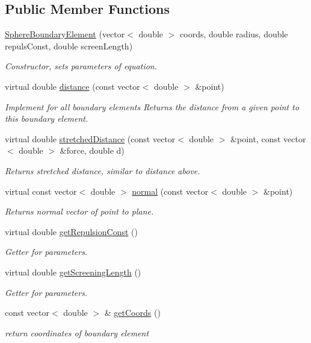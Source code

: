 \subsection*{Public Member Functions}
\begin{DoxyCompactItemize}
\item 
\hyperlink{classSphereBoundaryElement_a03cc51e8db0d5f638d772ac95720f436}{Sphere\+Boundary\+Element} (vector$<$ double $>$ coords, double radius, double repuls\+Const, double screen\+Length)
\begin{DoxyCompactList}\small\item\em Constructor, sets parameters of equation. \end{DoxyCompactList}\item 
virtual double \hyperlink{classSphereBoundaryElement_a8e28d60646f36a7ff943e69e62f248e4}{distance} (const vector$<$ double $>$ \&point)
\begin{DoxyCompactList}\small\item\em Implement for all boundary elements Returns the distance from a given point to this boundary element. \end{DoxyCompactList}\item 
virtual double \hyperlink{classSphereBoundaryElement_a41d124459d11422c46c578f70d1af1b0}{stretched\+Distance} (const vector$<$ double $>$ \&point, const vector$<$ double $>$ \&force, double d)
\begin{DoxyCompactList}\small\item\em Returns stretched distance, similar to distance above. \end{DoxyCompactList}\item 
virtual const vector$<$ double $>$ \hyperlink{classSphereBoundaryElement_a505ad6dae8dfaff38f2b845d6f7b7ee5}{normal} (const vector$<$ double $>$ \&point)
\begin{DoxyCompactList}\small\item\em Returns normal vector of point to plane. \end{DoxyCompactList}\item 
virtual double \hyperlink{classSphereBoundaryElement_aa9b8bd814e79f335232d3aac100148a0}{get\+Repulsion\+Const} ()
\begin{DoxyCompactList}\small\item\em Getter for parameters. \end{DoxyCompactList}\item 
virtual double \hyperlink{classSphereBoundaryElement_aacda85af577d438ce939274960d72045}{get\+Screening\+Length} ()
\begin{DoxyCompactList}\small\item\em Getter for parameters. \end{DoxyCompactList}\item 
const vector$<$ double $>$ \& \hyperlink{classBoundaryElement_ace76817d750bb44c11edd918f1a8b78f}{get\+Coords} ()
\begin{DoxyCompactList}\small\item\em return coordinates of boundary element \end{DoxyCompactList}\end{DoxyCompactItemize}
